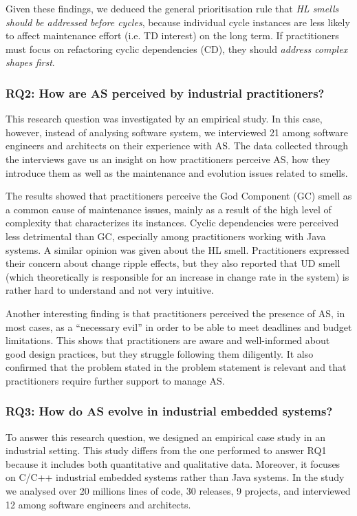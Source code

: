 Given these findings, we deduced the general prioritisation rule that \emph{HL smells should be addressed before cycles}, because individual cycle instances are less likely to affect maintenance effort (i.e. TD interest) on the long term.
If practitioners must focus on refactoring cyclic dependencies (CD), they should \emph{address complex shapes first}.

\subsubsection*{RQ2: How are AS perceived by industrial practitioners?}
This research question was investigated by an empirical study.
In this case, however, instead of analysing software system, we interviewed 21 among software engineers and architects on their experience with AS.
The data collected through the interviews gave us an insight on how practitioners perceive AS, how they introduce them as well as the maintenance and evolution issues related to smells. 

The results showed that practitioners perceive the God Component (GC) smell as a common cause of maintenance issues, mainly as a result of the high level of complexity that characterizes its instances. 
Cyclic dependencies were perceived less detrimental than GC, especially among practitioners working with Java systems. A similar opinion was given about the HL smell.
Practitioners expressed their concern about change ripple effects, but they also reported that UD smell (which theoretically is responsible for an increase in change rate in the system) is rather hard to understand and not very intuitive. 

Another interesting finding is that practitioners perceived the presence of AS, in most cases, as a ``necessary evil'' in order to be able to meet deadlines and budget limitations.
This shows that practitioners are aware and well-informed about good design practices, but they struggle following them diligently.
It also confirmed that the problem stated in the problem statement is relevant and that practitioners require further support to manage AS.

\subsubsection*{RQ3: How do AS evolve in industrial embedded systems?}
To answer this research question, we designed an empirical case study in an industrial setting.
This study differs from the one performed to answer RQ1 because it includes both quantitative and qualitative data. Moreover, it focuses on C/C++ industrial embedded systems rather than Java systems.
In the study we analysed over 20 millions lines of code, 30 releases, 9 projects, and interviewed 12 among software engineers and architects.


